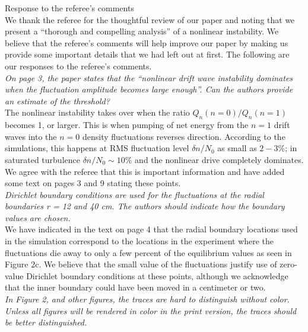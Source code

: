 \documentclass[12pt]{article}
\begin{document}
Response to the referee's comments \\ 

We thank the referee for the thoughtful review of our paper and noting that we present a ``thorough and compelling analysis'' of a nonlinear instability. We believe that the referee's comments will help
improve our paper by making us provide some important details that we had left out at first. The following are our responses to the referee's comments. \\

{\noindent \itshape  On page 3, the paper states that the “nonlinear drift wave instability dominates when
the fluctuation amplitude becomes large enough”. Can the authors provide an estimate of the threshold? }\\

{\noindent The nonlinear instability takes over when the ratio $Q_n(n=0)/Q_n(n=1)$ becomes 1, or larger. This is when pumping of net energy from the $n=1$ drift waves
into the $n=0$ density fluctuations reverses direction. According to the simulations, this happens at RMS fluctuation level $\delta n/N_0$ as small as $2-3\%$;
in saturated turbulence $\delta n/N_0 \sim 10 \%$ and the nonlinear drive completely dominates.
We agree with the referee that this is important information and have added some text on pages 3 and 9 stating these points. }\\

{\noindent \itshape    Dirichlet boundary conditions are used for the fluctuations at the radial boundaries r = 12 and 40 cm. The authors should indicate how the boundary values are chosen. }\\

{\noindent We have indicated in the text on page 4 that the radial boundary locations used in the simulation correspond to the locations in the experiment where the fluctuations die away to only
a few percent of the equilibrium values as seen in Figure 2c. We believe that the small value of the fluctuations justify use of zero-value Dirichlet boundary conditions at these points, although
we acknowledge that the inner boundary could have been moved in a centimeter or two. }\\

{\noindent \itshape  In Figure 2, and other figures, the traces are hard to distinguish without color. Unless all figures will be rendered in color in the print version, the traces should be better
distinguished. }\\
\end{document}

